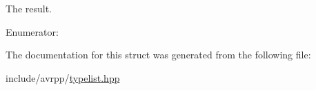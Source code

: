 The result. 

\begin{Desc}
\item[Enumerator: ]\par
\begin{description}
\item[{\em 
\hypertarget{structavrpp_1_1typelist_1_1compare__classes_a0b5562bc41787c1145fc1465c86e71a8af5720a2383fcf8183138b4404609001a}{
result}
\label{structavrpp_1_1typelist_1_1compare__classes_a0b5562bc41787c1145fc1465c86e71a8af5720a2383fcf8183138b4404609001a}
}]\end{description}
\end{Desc}



The documentation for this struct was generated from the following file:\begin{DoxyCompactItemize}
\item 
include/avrpp/\hyperlink{typelist_8hpp}{typelist.hpp}\end{DoxyCompactItemize}
